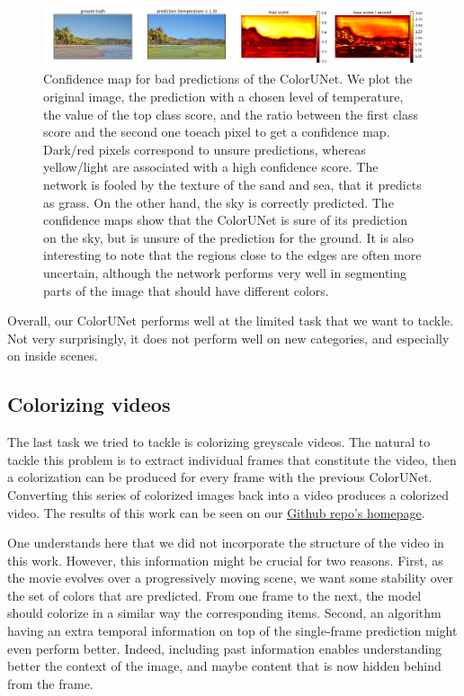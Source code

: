 \documentclass[10pt,twocolumn,letterpaper]{article}
\begin{document}
\begin{figure}
\begin{center}
\includegraphics[width=450px]{confidence}
\caption{Confidence map for bad predictions of the ColorUNet. We plot the original image, the prediction with a chosen level of temperature, the value of the top class score, and the ratio between the first class score and the second one toeach pixel to get a confidence map. Dark/red pixels correspond to unsure predictions, whereas yellow/light are associated with a high confidence score. The network is fooled by the texture of the sand and sea, that it predicts as grass. On the other hand, the sky is correctly predicted. The confidence maps show that the ColorUNet is sure of its prediction on the sky, but is unsure of the prediction for the ground. It is also interesting to note that the regions close to the edges are often more uncertain, although the network performs very well in segmenting parts of the image that should have different colors.}
\label{confidence}
\end{center}
\end{figure}

Overall, our ColorUNet performs well at the limited task that we want to tackle. Not very surprisingly, it does not perform well on new categories, and especially on inside scenes.


\subsection{Colorizing videos}

The last task we tried to tackle is colorizing greyscale videos. The natural to tackle this problem is to extract individual frames that constitute the video, then a colorization can be produced for every frame with the previous ColorUNet. Converting this series of colorized images back into a video produces a colorized video. The results of this work can be seen on our \href{https://github.com/vincentbillaut/all-colors-matter}{Github repo's homepage}.

One understands here that we did not incorporate the structure of the video in this work. However, this information might be crucial for two reasons. First, as the movie evolves over a progressively moving scene, we want some stability over the set of colors that are predicted. From one frame to the next, the model should colorize in a similar way the corresponding items. Second, an algorithm having an extra temporal information on top of the single-frame prediction might even perform better. Indeed, including past information enables understanding better the context of the image, and maybe content that is now hidden behind from the frame.
\end{document}
